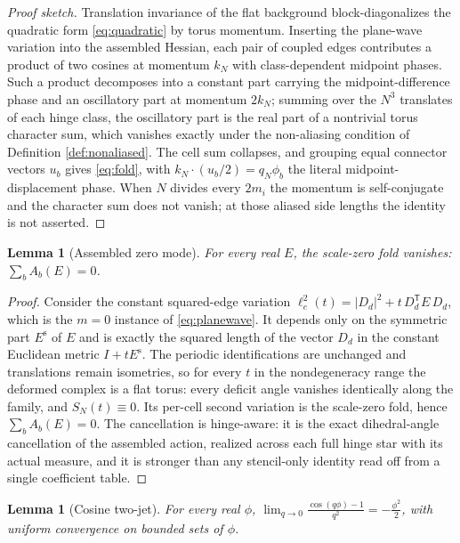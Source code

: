 \documentclass[11pt]{article}
\newtheorem{lemma}[theorem]{Lemma}
\theoremstyle{definition}
\theoremstyle{remark}
\newcommand{\trans}{\mathsf{T}}
\begin{document}
\begin{proof}[Proof sketch]
Translation invariance of the flat background block-diagonalizes the quadratic form \eqref{eq:quadratic} by torus momentum. Inserting the plane-wave variation into the assembled Hessian, each pair of coupled edges contributes a product of two cosines at momentum $k_N$ with class-dependent midpoint phases. Such a product decomposes into a constant part carrying the midpoint-difference phase and an oscillatory part at momentum $2k_N$; summing over the $N^3$ translates of each hinge class, the oscillatory part is the real part of a nontrivial torus character sum, which vanishes exactly under the non-aliasing condition of Definition \ref{def:nonaliased}. The cell sum collapses, and grouping equal connector vectors $u_b$ gives \eqref{eq:fold}, with $k_N\cdot(u_b/2)=q_N\phi_b$ the literal midpoint-displacement phase. When $N$ divides every $2m_i$ the momentum is self-conjugate and the character sum does not vanish; at those aliased side lengths the identity is not asserted.
\end{proof}

\begin{lemma}[Assembled zero mode]
\label{lem:zeromode}
For every real $E$, the scale-zero fold vanishes: $\sum_b A_b(E) = 0$.
\end{lemma}

\begin{proof}
Consider the constant squared-edge variation $\ell_e^2(t) = |D_d|^2 + t\,D_d^{\trans}E\,D_d$, which is the $m=0$ instance of \eqref{eq:planewave}. It depends only on the symmetric part $E^{\mathrm s}$ of $E$ and is exactly the squared length of the vector $D_d$ in the constant Euclidean metric $I + tE^{\mathrm s}$. The periodic identifications are unchanged and translations remain isometries, so for every $t$ in the nondegeneracy range the deformed complex is a flat torus: every deficit angle vanishes identically along the family, and $S_N(t)\equiv 0$. Its per-cell second variation is the scale-zero fold, hence $\sum_b A_b(E)=0$. The cancellation is hinge-aware: it is the exact dihedral-angle cancellation of the assembled action, realized across each full hinge star with its actual measure, and it is stronger than any stencil-only identity read off from a single coefficient table.
\end{proof}

\begin{lemma}[Cosine two-jet]
\label{lem:jet}
For every real $\phi$,
$\displaystyle\lim_{q\to 0}\frac{\cos(q\phi)-1}{q^{2}} = -\frac{\phi^{2}}{2}$,
with uniform convergence on bounded sets of $\phi$.
\end{lemma}
\end{document}
